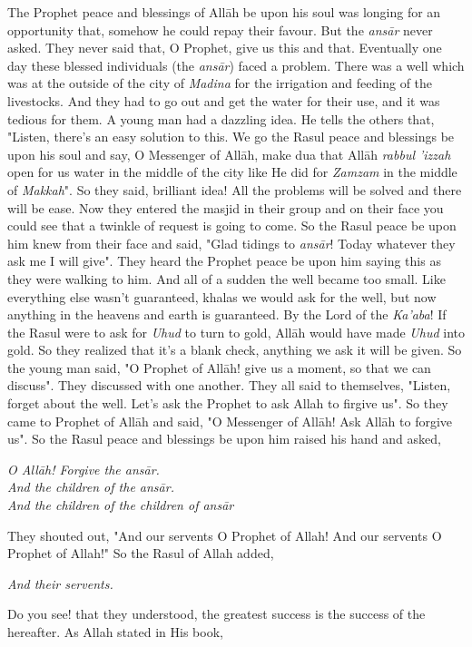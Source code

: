{The Prophet peace and blessings of All\=ah be upon his soul was longing for an opportunity that, somehow he could repay their favour. But the \textit{ans\=ar} never asked. They never said that, O Prophet, give us this and that. Eventually one day these blessed individuals (the \textit{ans\=ar}) faced a problem. There was a well which was at the outside of the city of \textit{Madina} for the irrigation and feeding of the livestocks. And they had to go out and get the water for their use, and it was tedious for them. A young man had a dazzling idea. He tells the others that, "Listen, there's an easy solution to this. We go the Rasul peace and blessings be upon his soul and say, O Messenger of All\=ah, make dua that All\=ah \textit{rabbul 'izzah} open for us water in the middle of the city like He did for \textit{Zamzam} in the middle of \textit{Makkah}". So they said, brilliant idea! All the problems will be solved and there will be ease. Now they entered the masjid in their group and on their face you could see that a twinkle of request is going to come. So the Rasul peace be upon him knew from their face and said, "Glad tidings to \textit{ans\=ar}! Today whatever they ask me I will give". They heard the Prophet peace be upon him saying this as they were walking to him. And all of a sudden the well became too small. Like everything else wasn't guaranteed, khalas we would ask for the well, but now anything in the heavens and earth is guaranteed. By the Lord of the \textit{Ka'aba}! If the Rasul were to ask for \textit{Uhud} to turn to gold, All\=ah would have made \textit{Uhud} into gold. So they realized that it's a blank check, anything we ask it will be given. So the young man said, "O Prophet of All\=ah! give us a moment, so that we can discuss". They discussed with one another. They all said to themselves, "Listen, forget about the well. Let's ask the Prophet to ask Allah to firgive us". So they came to Prophet of All\=ah and said, "O Messenger of All\=ah! Ask All\=ah to forgive us". So the Rasul peace and blessings be upon him raised his hand and asked,
\begin{center}
    \textit{
        O All\=ah! Forgive the ans\=ar.\\
        And the children of the ans\=ar.\\
        And the children of the children of ans\=ar
    }
\end{center}
They shouted out, "And our servents O Prophet of Allah! And our servents O Prophet of Allah!" So the Rasul of Allah added, 
\begin{center}
    \textit{And their servents.}
\end{center}

Do you see! that they understood, the greatest success is the success of the hereafter. As Allah stated in His book,
}
